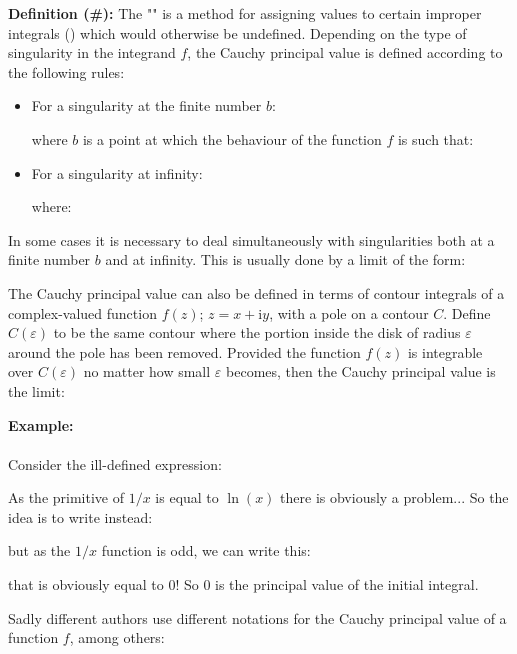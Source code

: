 	\textbf{Definition (\#\mydef):} The "" is a method for assigning values to certain improper integrals () which would otherwise be undefined. Depending on the type of singularity in the integrand $f$, the Cauchy principal value is defined according to the following rules:
	\begin{itemize}
		\item For a singularity at the finite number $b$:
		
		where $b$ is a point at which the behaviour of the function $f$ is such that:
		
	
		\item For a singularity at infinity:
		
		where:
		
	\end{itemize}
	In some cases it is necessary to deal simultaneously with singularities both at a finite number $b$ and at infinity. This is usually done by a limit of the form:
	
	The Cauchy principal value can also be defined in terms of contour integrals of a complex-valued function $f(z)$; $z = x + \mathrm{i}y$, with a pole on a contour $C$. Define $C(\varepsilon)$ to be the same contour where the portion inside the disk of radius $\varepsilon$ around the pole has been removed. Provided the function $f(z)$ is integrable over $C(\varepsilon)$ no matter how small $\varepsilon$ becomes, then the Cauchy principal value is the limit:
	
	\begin{tcolorbox}[colframe=black,colback=white,sharp corners]
	\textbf{{\Large {}}Example:}\\\\
	Consider the ill-defined expression:
	
	As the primitive of $1/x$ is equal to $\ln(x)$ there is obviously a problem... So the idea is to write instead:
	
	but as the $1/x$ function is odd, we can write this:
	
	that is obviously equal to $0$! So $0$ is the principal value of the initial integral.
	\end{tcolorbox}
	
	\begin{tcolorbox}[title=Remark,colframe=black,arc=10pt]
	Sadly different authors use different notations for the Cauchy principal value of a function $f$, among others:
	
	\end{tcolorbox}

